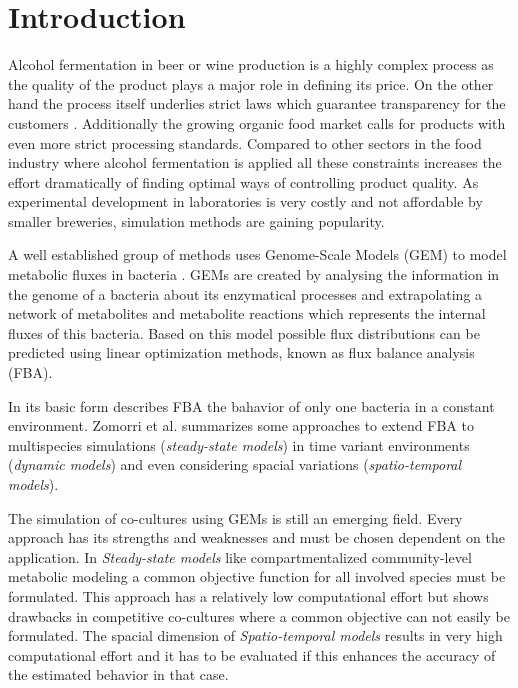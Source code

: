 \section{Introduction}\label{sec:introduction}

Alcohol fermentation in beer or wine production is a highly complex process as the quality
of the product plays a major role in defining its price. On the other hand the process
itself underlies strict laws which guarantee transparency for the customers\cite{biergesetz_1993}
\cite{weingesetz_1994}. Additionally the growing organic food market calls for products
with even more strict processing standards\cite{demeter_processing_standards_2017}.
Compared to other sectors in the food industry where alcohol fermentation is applied all these
constraints increases the effort dramatically of finding optimal ways of controlling product
quality. As experimental development in laboratories is very costly and not affordable by smaller
breweries, simulation methods are gaining popularity.


A well established group of methods uses Genome-Scale Models (GEM) to model metabolic fluxes in bacteria \cite{zomorrodi_synthetic_2016}.
GEMs are created by analysing the information in the genome of a bacteria about its enzymatical
processes and extrapolating a network of metabolites and metabolite reactions which represents
the internal fluxes of this bacteria. Based on this model possible flux distributions can be
predicted using linear optimization methods, known as flux balance analysis (FBA)\cite{}.

In its basic form describes FBA the bahavior of only one bacteria in a constant environment.
Zomorri et al. summarizes some approaches to extend FBA to multispecies simulations
(\textit{steady-state models}) in time variant environments (\textit{dynamic models})
and even considering spacial variations (\textit{spatio-temporal models})\cite{zomorrodi_synthetic_2016}.

The simulation of co-cultures using GEMs is still an emerging field. Every approach has
its strengths and weaknesses and must be chosen dependent on the application.
In \textit{Steady-state models} like compartmentalized community-level metabolic modeling a
common objective function for all involved species must be formulated. This approach has 
a relatively low computational effort but shows drawbacks in competitive co-cultures where
a common objective can not easily be formulated.
The spacial dimension of \textit{Spatio-temporal models} results in very high computational
effort and it has to be evaluated if this enhances the accuracy of the estimated behavior
in that case.

